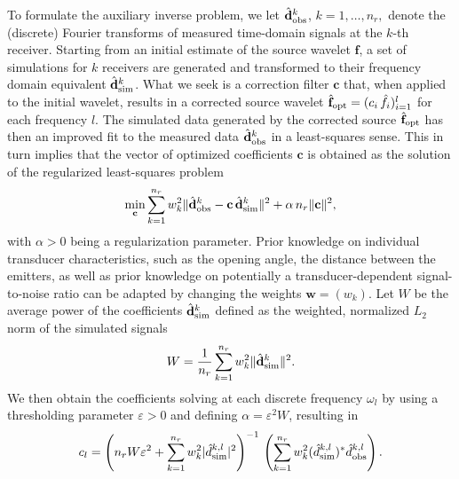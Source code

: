 \documentclass[12pt]{iopart}
\begin{document}
To formulate the auxiliary inverse problem, we let $\hat{\mathbf{d}}_{\mbox{\scriptsize obs}}^k$, $k=1,\ldots,n_r,$ denote the (discrete) Fourier transforms of measured time-domain signals at the $k$-th receiver. Starting from an initial estimate of the source wavelet $\mathbf{f}$, a set of simulations for $k$ receivers are generated and transformed to their frequency domain equivalent $\hat{\mathbf{d}}_{\mbox{\scriptsize sim}}^k$. What we seek is a correction filter $\mathbf{c}$ that, when applied to the initial wavelet, results in a corrected source wavelet $\hat{\mathbf{f}}_{\mbox{\scriptsize opt}} = ({c}_i\,\hat{f}_i)_{i=1}^l$ for each frequency $l$. The simulated data generated by the corrected source $\hat{\mathbf{f}}_{\mbox{\scriptsize opt}}$ has then an improved fit to the measured data $\hat{\mathbf{d}}_{\mbox{\scriptsize obs}}^k$ in a least-squares sense. This in turn implies that the vector of optimized coefficients $\mathbf{c}$ is obtained as the solution of the regularized least-squares problem
\begin{equation}\label{eq:lsq-c}
    \min_{\mathbf{c}} \sum_{k=1}^{n_r} w_k^2 \|  \hat{\mathbf{d}}_{\mbox{\scriptsize obs}}^k - \mathbf{c}\, \hat{\mathbf{d}}_{\mbox{\scriptsize sim}}^k  \|^2 + \alpha \,n_r \| \mathbf{c} \|^2, 
\end{equation}
with $\alpha > 0$ being a regularization parameter. Prior knowledge on individual transducer characteristics, such as the opening angle, the distance between the emitters, as well as prior knowledge on potentially a transducer-dependent signal-to-noise ratio can be adapted by changing the weights $\mathbf{w}= (w_k)$. Let $W$ be the average power of the coefficients $\hat{\mathbf{d}}_{\mbox{\scriptsize sim}}^{k}$ defined as the weighted, normalized $L_2$ norm of the simulated signals
\begin{equation}
    W = \frac{1}{n_r}\sum_{k=1}^{n_r} w_k^2 \| \hat{\mathbf{d}}_{\mbox{\scriptsize sim}}^{k} \|^2.
\end{equation}
We then obtain the coefficients solving  at each discrete frequency $\omega_l$ by using a thresholding parameter $\varepsilon > 0$ and defining $\alpha = \varepsilon^2 W$, resulting in 
\begin{equation}
    c_l = \left(n_r W \varepsilon^2 + \sum_{k=1}^{n_r} w_k^2 | \hat{d}_{\mbox{\scriptsize sim}}^{k,l} |^2 \right)^{-1} \,\left( \sum_{k=1}^{n_r} w_k^2  (\hat{d}_{\mbox{\scriptsize sim}}^{k,l})^* \hat{d}_{\mbox{\scriptsize obs}}^{k,l}  \right).
\end{equation}
\end{document}
